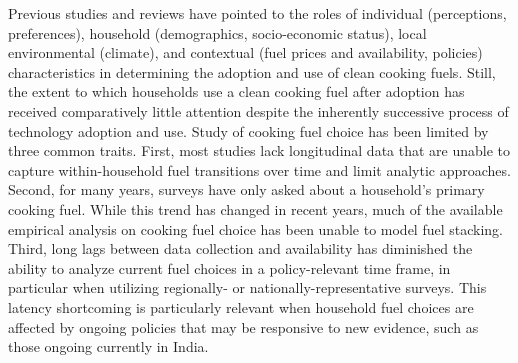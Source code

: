 \documentclass[11pt,english]{article}
\theoremstyle{plain} \newtheorem{claim}{Claim}
\theoremstyle{plain} \newtheorem{prop}{Proposition}
\theoremstyle{plain} \newtheorem{hypo}{Hypothesis}
\begin{document}
Previous studies and reviews have pointed to the roles of individual (perceptions, preferences), household (demographics, socio-economic status), local environmental (climate), and contextual (fuel prices and availability, policies) characteristics in determining the adoption and use of clean cooking fuels\citep{MullerYan2018,Quinnetal2018,Puzzoloetal2016,LewisPattanayak2012}. Still, the extent to which households use a clean cooking fuel after adoption has received comparatively little attention despite the inherently successive process of technology adoption and use. Study of cooking fuel choice has been limited by three common traits. First, most studies lack longitudinal data that are unable to capture within-household fuel transitions over time and limit analytic approaches. Second, for many years, surveys have only asked about a household's primary cooking fuel. While this trend has changed in recent years, much of the available empirical analysis on cooking fuel choice has been unable to model fuel stacking. Third, long lags between data collection and availability has diminished the ability to analyze current fuel choices in a policy-relevant time frame, in particular when utilizing regionally- or nationally-representative surveys. This latency shortcoming is particularly relevant when household fuel choices are affected by ongoing policies that may be responsive to new evidence, such as those ongoing currently in India. 
\end{document}
